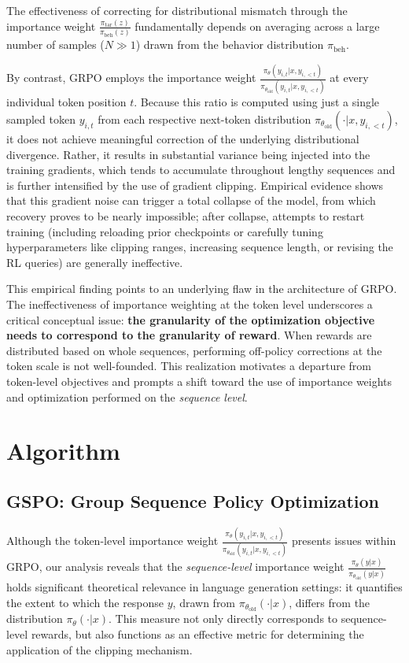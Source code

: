 The effectiveness of correcting for distributional mismatch through the importance weight $\frac{ \pi_\text{tar} (z) }{ \pi_\text{beh} (z)}$ fundamentally depends on averaging across a large number of samples ($N \gg 1$) drawn from the behavior distribution $\pi_\text{beh}$. 

By contrast, GRPO employs the importance weight $\frac{ \pi_{\theta} (y_{i,t} | x, y_{i,<t}) }{ \pi_{\theta_\text{old}} (y_{i,t} | x,y_{i,<t})}$ at every individual token position $t$. Because this ratio is computed using just a single sampled token $y_{i,t}$ from each respective next-token distribution $\pi_{\theta_\text{old}}( \cdot | x, y_{i, <t})$, it does not achieve meaningful correction of the underlying distributional divergence. Rather, it results in substantial variance being injected into the training gradients, which tends to accumulate throughout lengthy sequences and is further intensified by the use of gradient clipping. Empirical evidence shows that this gradient noise can trigger a total collapse of the model, from which recovery proves to be nearly impossible; after collapse, attempts to restart training (including reloading prior checkpoints or carefully tuning hyperparameters like clipping ranges, increasing sequence length, or revising the RL queries) are generally ineffective.

This empirical finding points to an underlying flaw in the architecture of GRPO. The ineffectiveness of importance weighting at the token level underscores a critical conceptual issue: \textbf{the granularity of the optimization objective needs to correspond to the granularity of reward}. When rewards are distributed based on whole sequences, performing off-policy corrections at the token scale is not well-founded. This realization motivates a departure from token-level objectives and prompts a shift toward the use of importance weights and optimization performed on the \textit{sequence level}.

\section{Algorithm}

\subsection{GSPO: Group Sequence Policy Optimization}

Although the token-level importance weight $\frac{ \pi_{\theta} (y_{i,t} | x, y_{i,<t}) }{ \pi_{\theta_\text{old}} (y_{i,t} | x,y_{i,<t})}$ presents issues within GRPO, our analysis reveals that the \textit{sequence-level} importance weight $\frac{ \pi_{\theta} (y | x) }{ \pi_{\theta_\text{old}} (y | x)}$ holds significant theoretical relevance in language generation settings: it quantifies the extent to which the response $y$, drawn from $\pi_{\theta_\text{old}} (\cdot | x)$, differs from the distribution $\pi_{\theta} (\cdot | x)$. This measure not only directly corresponds to sequence-level rewards, but also functions as an effective metric for determining the application of the clipping mechanism.

